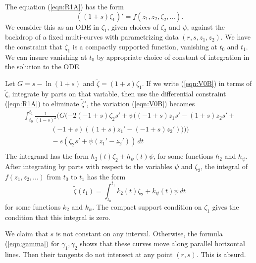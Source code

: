 \documentclass[11pt]{amsart}
\begin{document}
The equation (\ref{eqn:R1A}) has the form 
  $$((1+s)\zeta_1)' =  f(z_1,z_2,\zeta_2,\ldots).$$
We consider this as an ODE in $\zeta_1$, given choices of $\zeta_2$ and $\psi$, against the backdrop of a fixed multi-curves with parametrizing data $(r,s,z_1,z_2)$.
We have the constraint that $\zeta_1$ is a compactly supported function, vanishing
at $t_0$ and $t_1$. We can insure vanishing at $t_0$ by appropriate choice of constant
of integration in the solution to the ODE.  

Let $G = s - \ln(1+s)$ and $\tilde\zeta=(1+s)\zeta_1$.  If we write (\ref{eqn:V0B})  in terms of $\tilde\zeta$,
integrate by parts on that variable, then use the differential constraint (\ref{eqn:R1A}) to eliminate $\tilde\zeta'$, the variation  (\ref{eqn:V0B})  becomes
\begin{equation}\label{eqn:V0C}
\begin{array}{lll}
\int_{t_0}^{t_1}
 \frac 1 {(1-s)^2} (G (-2 (-1+s)\zeta_2 s' + \psi ((-1+s) z_1 s' - (1+s) z_2 s' + \\
\qquad\qquad (-1+s) ((1+s) z_1' - (-1 + s) z_2'))))\\
\qquad\qquad -s (\zeta_2 s' + \psi (z_1' - z_2'))\,dt \\
\end{array}
\end{equation}
The integrand has the form
$h_2(t) \zeta_2 + h_\psi(t) \psi$, for some functions $h_2$ and $h_\psi$.  After
integrating by parts with respect to the variables $\psi$ and $\zeta_2$, 
the integral of $f(z_1,z_2,\ldots)$ from $t_0$ to $t_1$ has the form
\begin{equation}\label{eqn:compact}
\tilde\zeta(t_1)=\int_{t_0}^{t_1} k_2(t) \zeta_2 + k_\psi(t)\psi\,dt
\end{equation}
for some functions $k_2$ and $k_\psi$.  The compact support condition on $\zeta_1$
gives the condition that this integral is zero.


We claim that $s$ is not constant on any interval.  Otherwise, the formula (\ref{eqn:gamma}) for
$\gamma_1,\gamma_2$ shows that these curves move along parallel horizontal lines.
Then their tangents do not intersect at any point $(r,s)$.  This is absurd.
\end{document}
